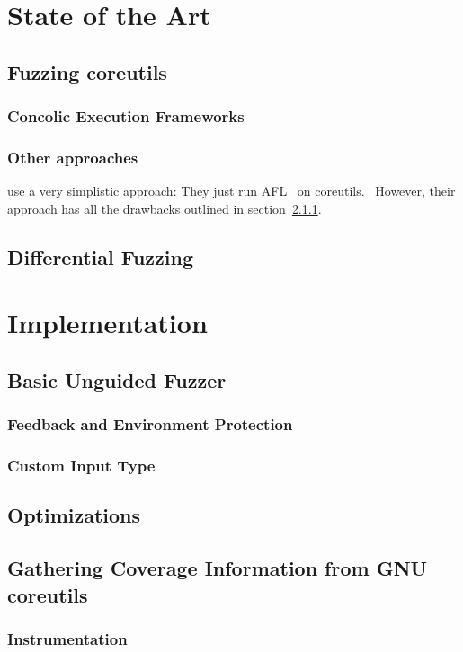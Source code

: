 \documentclass{article}
\let\savedCite=\cite
\renewcommand{\cite}{\unskip~\savedCite}
\let\savedRef=\ref
\renewcommand{\ref}{\unskip~\savedRef}
\begin{document}
\begin{multicols}{2}
    \section{State of the Art}
    \subsection{Fuzzing coreutils}
    \subsubsection{Concolic Execution Frameworks}
    \subsubsection{Other approaches}
    \citeauthor{AFLCoreutils} use a very simplistic approach: They just run AFL\cite{AFL} on coreutils.\cite{AFLCoreutils} However, their approach has all the drawbacks outlined in section\ref{Environment}.
    \subsection{Differential Fuzzing}

    \section{Implementation}
    \subsection{Basic Unguided Fuzzer}
    \subsubsection{Feedback and Environment Protection}
    \label{Environment}
    \subsubsection{Custom Input Type}
    \subsection{Optimizations}
    \subsection{Gathering Coverage Information from GNU coreutils}
    \subsubsection{Instrumentation}

\end{multicols}
\end{document}
